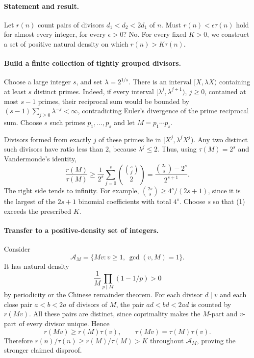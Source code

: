 \paragraph{Statement and result.}
Let \(r(n)\) count pairs of divisors \(d_1<d_2<2d_1\) of \(n\).
Must \(r(n)<\epsilon\tau(n)\) hold for almost every integer, for
every \(\epsilon>0\)?
No. For every fixed \(K>0\), we construct a set of positive natural
density on which \(r(n)>K\tau(n)\).

\paragraph{Build a finite collection of tightly grouped divisors.}
Choose a large integer \(s\), and set \(\lambda=2^{1/s}\).
There is an interval \([X,\lambda X)\) containing at least \(s\)
distinct primes. Indeed, if every interval
\([\lambda^j,\lambda^{j+1})\), \(j\geq0\), contained at most \(s-1\)
primes, their reciprocal sum would be bounded by
\((s-1)\sum_{j\geq0}\lambda^{-j}<\infty\), contradicting Euler's
divergence of the prime reciprocal sum.
Choose \(s\) such primes \(p_1,\ldots,p_s\) and let \(M=p_1\cdots p_s\).

Divisors formed from exactly \(j\) of these primes lie in
\([X^j,\lambda^jX^j)\). Any two distinct such divisors have ratio
less than \(2\), because \(\lambda^j\leq2\).
Thus, using \(\tau(M)=2^s\) and Vandermonde's identity,
\[
 \frac{r(M)}{\tau(M)}
 \geq\frac1{2^s}\sum_{j=0}^{s}\binom{\binom sj}{2}
 =\frac{\binom{2s}{s}-2^s}{2^{s+1}}.
 \tag{1}
\]
The right side tends to infinity. For example,
\(\binom{2s}{s}\geq4^s/(2s+1)\), since it is the largest of the
\(2s+1\) binomial coefficients with total \(4^s\).
Choose \(s\) so that (1) exceeds the prescribed \(K\).

\paragraph{Transfer to a positive-density set of integers.}
Consider
\[
 \mathcal A_M=\{Mv:v\geq1,\ \gcd(v,M)=1\}.
\]
It has natural density
\[
 \frac1M\prod_{p\mid M}(1-1/p)>0
 \tag{2}
\]
by periodicity or the Chinese remainder theorem.
For each divisor \(d\mid v\) and each close pair \(a<b<2a\)
of divisors of \(M\), the pair \(ad<bd<2ad\) is counted by \(r(Mv)\).
All these pairs are distinct, since coprimality makes the
\(M\)-part and \(v\)-part of every divisor unique. Hence
\[
 r(Mv)\geq r(M)\tau(v),\qquad
 \tau(Mv)=\tau(M)\tau(v).
\]
Therefore \(r(n)/\tau(n)\geq r(M)/\tau(M)>K\) throughout
\(\mathcal A_M\), proving the stronger claimed disproof.


